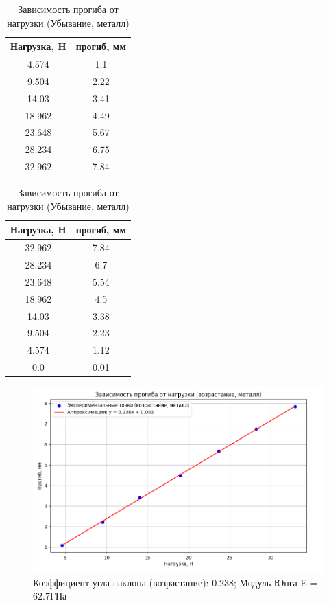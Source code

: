 \documentclass[a4paper, 12pt]{article}
\begin{document}
\begin{table}[h]
\centering
\begin{minipage}{0.45\textwidth}
\centering
\caption{Зависимость прогиба от нагрузки (Возрастание, металл)}
\begin{tabular}{|c|c|}
\hline
Нагрузка, H & прогиб, мм \\
\hline
4.574 & 1.1 \\
\hline
9.504 & 2.22 \\
\hline
14.03 & 3.41 \\
\hline
18.962 & 4.49 \\
\hline
23.648 & 5.67 \\
\hline
28.234 & 6.75 \\
\hline
32.962 & 7.84 \\
\hline
\end{tabular}
\end{minipage}
\hfill
\begin{minipage}{0.45\textwidth}
\centering
\caption{Зависимость прогиба от нагрузки (Убывание, металл)}
\begin{tabular}{|c|c|}
\hline
Нагрузка, H & прогиб, мм \\
\hline
32.962 & 7.84 \\
\hline
28.234 & 6.7 \\
\hline
23.648 & 5.54 \\
\hline
18.962 & 4.5 \\
\hline
14.03 & 3.38 \\
\hline
9.504 & 2.23 \\
\hline
4.574 & 1.12 \\
\hline
0.0 & 0.01 \\
\hline
\end{tabular}
\end{minipage}
\end{table}

\begin{figure}[h]
\centering
\includegraphics[width=0.8\linewidth]{G3.png}
\caption{Коэффициент угла наклона (возрастание): 0.238; Модуль Юнга E = 62.7ГПа}
\label{fig:increase}
\end{figure}
\end{document}
